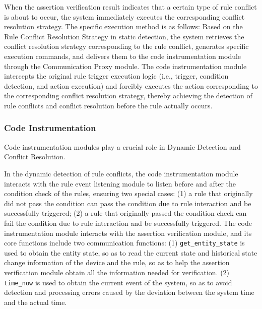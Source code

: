 When the assertion verification result indicates that a certain type of rule conflict is about to occur, the system immediately executes the corresponding conflict resolution strategy. The specific execution method is as follows: Based on the Rule Conflict Resolution Strategy in static detection, the system retrieves the conflict resolution strategy corresponding to the rule conflict, generates specific execution commands, and delivers them to the code instrumentation module through the Communication Proxy module. The code instrumentation module intercepts the original rule trigger execution logic (i.e., trigger, condition detection, and action execution) and forcibly executes the action corresponding to the corresponding conflict resolution strategy, thereby achieving the detection of rule conflicts and conflict resolution before the rule actually occurs.
\subsubsection{Code Instrumentation}
Code instrumentation modules play a crucial role in Dynamic Detection and Conflict Resolution.

In the dynamic detection of rule conflicts, the code instrumentation module interacts with the rule event listening module to listen before and after the condition check of the rules, ensuring two special cases: (1) a rule that originally did not pass the condition can pass the condition due to rule interaction and be successfully triggered; (2) a rule that originally passed the condition check can fail the condition due to rule interaction and be successfully triggered. The code instrumentation module interacts with the assertion verification module, and its core functions include two communication functions: (1) \texttt{get\_entity\_state} is used to obtain the entity state, so as to read the current state and historical state change information of the device and the rule, so as to help the assertion verification module obtain all the information needed for verification. (2) \texttt{time\_now} is used to obtain the current event of the system, so as to avoid detection and processing errors caused by the deviation between the system time and the actual time.

